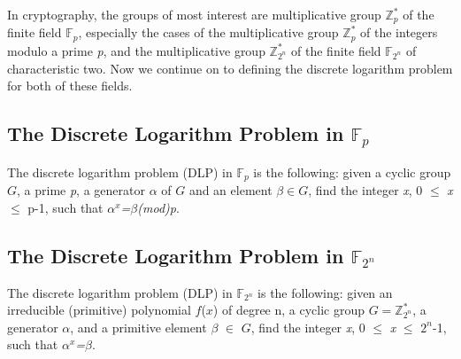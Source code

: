 \documentclass[iwp,first]{luthesis}
\begin{document}
In cryptography, the groups of most interest are multiplicative group $\mathbb{Z}^{*}_{p}$ of the finite field $\mathbb{F}_p$, especially the cases of the multiplicative group $\mathbb{Z}^{*}_{p}$ of the integers modulo a prime \textit{p}, and the multiplicative group $\mathbb{Z}^{*}_{2^n}$ of the finite field $\mathbb{F}_{2^n}$ of characteristic two. Now we continue on to defining the discrete logarithm problem for both of these fields.

\subsection{The Discrete Logarithm Problem in $\mathbb{F}_p$}

\begin{mydef}
The discrete logarithm problem (DLP) in $\mathbb{F}_p$ is the following: given a cyclic group $G$, a prime \textit{p}, a generator \textit{$\alpha$} of $G$ and an element $\beta\in G$, find the integer \textit{x}, 0 $\leq$ \textit{x} $\leq$ p-1, such that \textit{$\alpha$$^x$=$\beta$(mod)p}.
\end{mydef}

\subsection{The Discrete Logarithm Problem in $\mathbb{F}_{2^n}$}

\begin{mydef}
The discrete logarithm problem (DLP) in $\mathbb{F}_{2^n}$ is the following: given an irreducible (primitive) polynomial $f$($x$) of degree n, a cyclic group $G=\mathbb{Z}^{*}_{2^n}$, a generator $\alpha$, and a primitive element $\beta$ $\in$ $G$, find the integer \textit{x}, 0 $\leq$ \textit{x} $\leq$ ${2^n}$-1, such that \textit{$\alpha$$^x$=$\beta$}.
\end{mydef}
\end{document}
